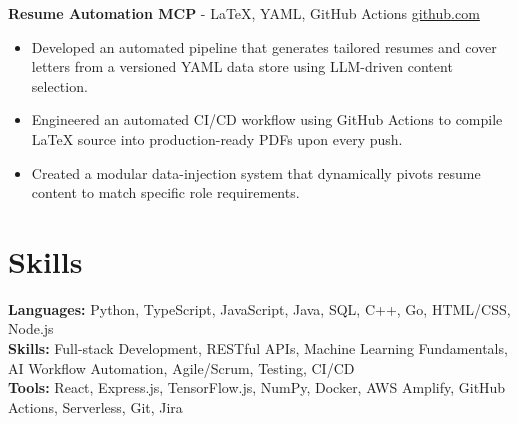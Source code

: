 \documentclass[11pt]{article}       %
\begin{document}
\textbf{Resume Automation MCP}{ - LaTeX, YAML, GitHub Actions} \hfill \href{https://github.com/Monica20030707/Tex_OrangeLeaf-mcp}{github.com} \\
\vspace{-9pt}
\begin{itemize}
  \item Developed an automated pipeline that generates tailored resumes and cover letters from a versioned YAML data store using LLM-driven content selection.
  \item Engineered an automated CI/CD workflow using GitHub Actions to compile LaTeX source into production-ready PDFs upon every push.
  \item Created a modular data-injection system that dynamically pivots resume content to match specific role requirements.
\end{itemize}

\vspace{-18.5pt}


\section*{Skills}
\textbf{Languages:} Python, TypeScript, JavaScript, Java, SQL, C++, Go, HTML/CSS, Node.js\\
\textbf{Skills:} Full-stack Development, RESTful APIs, Machine Learning Fundamentals, AI Workflow Automation, Agile/Scrum, Testing, CI/CD\\
\textbf{Tools:} React, Express.js, TensorFlow.js, NumPy, Docker, AWS Amplify, GitHub Actions, Serverless, Git, Jira\\

\vspace{-6.5pt}
\end{document}
